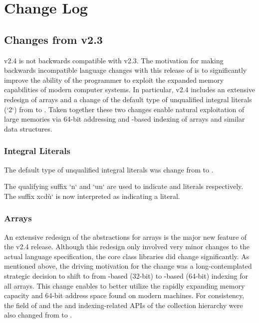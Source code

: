 \chapter{Change Log}

\section{Changes from \Xten{} v2.3}
\Xten{} v2.4 is not backwards compatible with \Xten{} v2.3. The
motivation for making backwards incompatible language changes with
this release of \Xten{} is to significantly improve the ability of the
\Xten{} programmer to exploit the expanded memory capabilities of
modern computer systems.  In particular, \Xten{} v2.4 includes an
extensive redesign of arrays and a change of the default type of
unqualified integral literals (\eg \xcd`2`) from  to
. Taken together these two changes enable natural
exploitation of large memories via 64-bit addressing and
-based indexing of arrays and similar data structures. 

\subsection{Integral Literals}

The default type of unqualified integral literals was change from
 to . 

The qualifying suffix \xcd`n` and \xcd`un` are used to indicate
 and  literals respectively.  The suffix xcd\`u` is
now interpreted as indicating a  literal.

\subsection{Arrays}

An extensive redesign of the \Xten{} abstractions for arrays is the
major new feature of the \Xten{} v2.4 release.  Although this redesign
only involved very minor changes to the actual \Xten{} language
specification, the core class libraries did change significantly.  As
mentioned above, the driving motivation for
the change was a long-contemplated strategic decision to shift to from
-based (32-bit) to -based (64-bit) indexing for all
\Xten{} arrays. This change enables \Xten{} to better utilize the rapidly
expanding memory capacity and 64-bit address space found on modern
machines. For consistency, the  field of  and
the  and indexing-related APIs of the 
collection hierarchy were also changed from  to .

